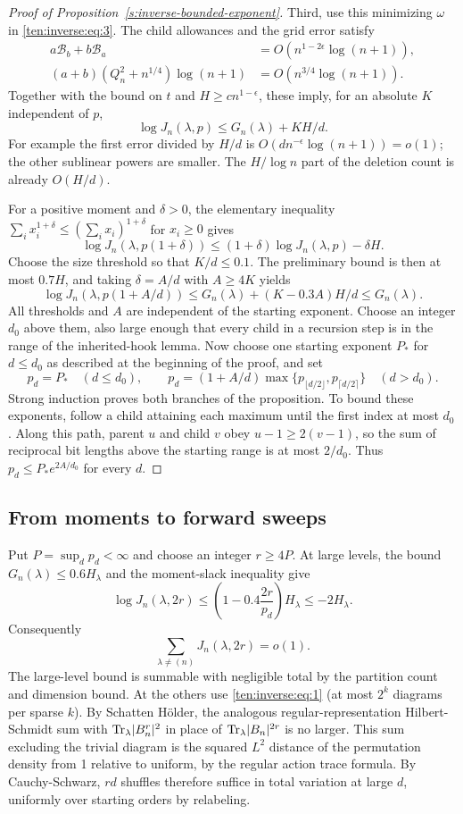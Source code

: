 \begin{proof}[Proof of Proposition~\ref{s:inverse-bounded-exponent}]
Third, use this minimizing $\omega$ in \eqref{ten:inverse:eq:3}.
The child allowances and the grid error satisfy
\[
 \begin{aligned}
 a\mathcal B_b+b\mathcal B_a
   &=O(n^{1-2\epsilon}\log(n+1)),\\
 (a+b)(Q_n^2+n^{1/4})\log(n+1)
   &=O(n^{3/4}\log(n+1)).
 \end{aligned}
\]
Together with the bound on $t$ and $H\ge c n^{1-\epsilon}$,
these imply, for an absolute $K$ independent of $p$,
\[
 \log J_n(\lambda,p)\le G_n(\lambda)+KH/d.
\]
For example the first error divided by $H/d$ is
$O(d n^{-\epsilon}\log(n+1))=o(1)$; the other sublinear powers
are smaller. The $H/\log n$ part of the deletion count is already
$O(H/d)$.

For a positive moment and $\delta>0$, the elementary inequality
$\sum_i x_i^{1+\delta}\le(\sum_i x_i)^{1+\delta}$ for $x_i\ge0$
gives
\[
 \log J_n(\lambda,p(1+\delta))
 \le(1+\delta)\log J_n(\lambda,p)-\delta H.
\]
Choose the size threshold so that $K/d\le0.1$. The preliminary
bound is then at most $0.7H$, and taking $\delta=A/d$ with
$A\ge4K$ yields
\[
 \log J_n(\lambda,p(1+A/d))
 \le G_n(\lambda)+(K-0.3A)H/d
 \le G_n(\lambda).
\]
All thresholds and $A$ are independent of the starting exponent.
Choose an integer $d_0$ above them, also large enough that every child
in a recursion step is in the range of the inherited-hook lemma.
Now choose one starting exponent $P_*$ for $d\le d_0$ as described
at the beginning of the proof, and set
\[
 p_d=P_*\quad(d\le d_0),\qquad
 p_d=(1+A/d)\max\{p_{\lfloor d/2\rfloor},p_{\lceil d/2\rceil}\}
       \quad(d>d_0).
\]
Strong induction proves both branches of the proposition. To bound
these exponents, follow a child attaining each maximum until the first
index at most $d_0$. Along this path, parent $u$ and child $v$ obey
$u-1\ge2(v-1)$, so the sum of reciprocal bit lengths above the
starting range is at most $2/d_0$. Thus
$p_d\le P_*e^{2A/d_0}$ for every $d$.
\end{proof}

\subsection{From moments to forward sweeps}
Put $P=\sup_d p_d<\infty$ and choose an integer $r\ge4P$. At large levels, the bound $G_n(\lambda)\le0.6H_\lambda$ and the moment-slack inequality give
\[
 \log J_n(\lambda,2r)
 \le\left(1-0.4\frac{2r}{p_d}\right)H_\lambda
 \le-2H_\lambda.
\]
Consequently
\[
 \sum_{\lambda\ne(n)} J_n(\lambda,2r)=o(1).
\]
The large-level bound is summable with negligible total by the partition count and dimension bound. At the others use \eqref{ten:inverse:eq:1} (at most \(2^k\) diagrams per sparse \(k\)). By Schatten H\"older, the analogous regular-representation Hilbert-Schmidt sum with \({\rm Tr}_\lambda|B_n^r|^2\) in place of \({\rm Tr}_\lambda|B_n|^{2r}\) is no larger. This sum excluding the trivial diagram is the squared \(L^2\) distance of the permutation density from 1 relative to uniform, by the regular action trace formula. By Cauchy-Schwarz, \(rd\) shuffles therefore suffice in total variation at large \(d\), uniformly over starting orders by relabeling.
